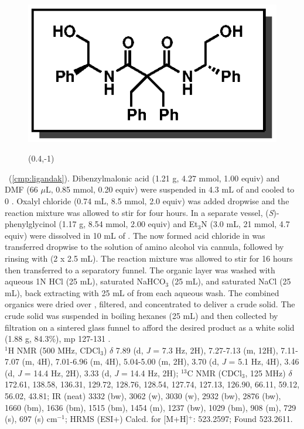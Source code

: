 \vspace{10pt}
\begin{figure}
  \vspace{-20pt}
  \begin{center}
    \includegraphics[scale=0.8]{chp_asymmetric/images/ligandak}
           \begin{textblock}{1}(0.4,-1)  \end{textblock}
  \end{center}
  \vspace{-25pt}
\end{figure}
\noindent \textbf{\CMPligandak}\ (\ref{cmp:ligandak}). Dibenzylmalonic acid (1.21 g, 4.27 mmol,
1.00 equiv) and DMF (66 $\mu$L, 0.85 mmol, 0.20 equiv) were suspended in 4.3 mL of  and
cooled to 0 \degc. Oxalyl chloride (0.74 mL, 8.5 mmol, 2.0 equiv) was added dropwise and the
reaction mixture was allowed to stir for four hours. In a separate vessel,
(\textit{S})-phenylglycinol (1.17 g, 8.54 mmol, 2.00 equiv) and Et$_3$N (3.0 mL, 21 mmol, 4.7 equiv)
were dissolved in 10 mL of . The now formed acid chloride in  was transferred
dropwise to the solution of amino alcohol via cannula, followed by rinsing with  (2 x 2.5
mL). The reaction mixture was allowed to stir for 16 hours then transferred to a separatory funnel.
The organic layer was washed with aqueous 1N HCl (25 mL), saturated NaHCO$_3$ (25 mL), and saturated
NaCl (25 mL), back extracting with 25 mL of  from each aqueous wash. The combined
organics were dried over , filtered, and concentrated to deliver a crude solid. The crude
solid was suspended in boiling hexanes (25 mL) and then collected by filtration on a sintered glass
funnel to afford the desired product as a white solid (1.88 g, 84.3\%), mp 127-131 \degc. \\
$^1$H NMR (500 MHz, CDCl$_3$) $\delta$ 7.89 (d, \textit{J} = 7.3 Hz, 2H), 7.27-7.13 (m, 12H),
7.11-7.07 (m, 4H), 7.01-6.96 (m, 4H), 5.04-5.00 (m, 2H), 3.70 (d, \textit{J} = 5.1 Hz, 4H), 3.46 (d,
\textit{J} = 14.4 Hz, 2H), 3.33 (d, \textit{J} = 14.4 Hz, 2H); $^{13}$C NMR (CDCl$_3$, 125 MHz)
$\delta$ 172.61, 138.58, 136.31, 129.72, 128.76, 128.54, 127.74, 127.13, 126.90, 66.11, 59.12, 56.02, 43.81; IR (neat) 3332 (bw), 3062 (w), 3030 (w), 2932 (bw), 2876 (bw), 1660 (bm), 1636 (bm), 1515 (bm), 1454 (m), 1237 (bw), 1029 (bm), 908 (m), 729 (s), 697 (s) cm$^{-1}$; HRMS (ESI+) Calcd. for 
[M+H]$^+$: 523.2597; Found 523.2611.

